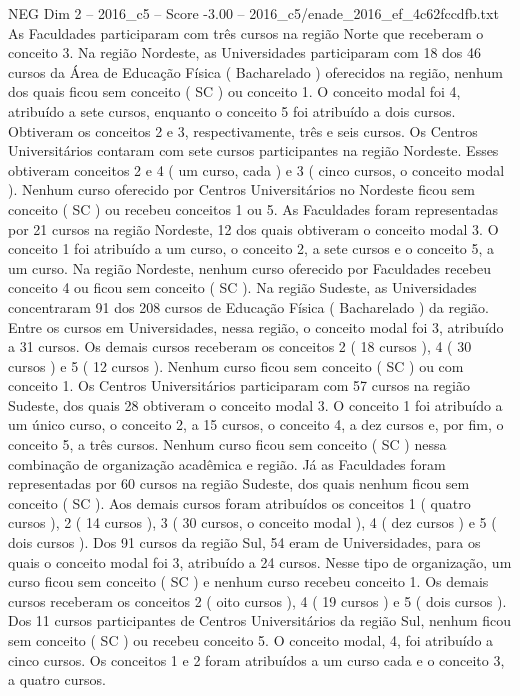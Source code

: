 \begin{textsample}{NEG Dim 2 – 2016\_c5 – Score -3.00 – 2016\_c5/enade\_2016\_ef\_4c62fccdfb.txt}
As Faculdades participaram com três cursos na região Norte que receberam o conceito 3.
Na região Nordeste, as Universidades participaram com 18 dos 46 cursos da Área de Educação Física ( Bacharelado ) oferecidos na região, nenhum dos quais ficou sem conceito ( SC ) ou conceito 1.
O conceito modal foi 4, atribuído a sete cursos, enquanto o conceito 5 foi atribuído a dois cursos.
Obtiveram os conceitos 2 e 3, respectivamente, três e seis cursos.
Os Centros Universitários contaram com sete cursos participantes na região Nordeste.
Esses obtiveram conceitos 2 e 4 ( um curso, cada ) e 3 ( cinco cursos, o conceito modal ).
Nenhum curso oferecido por Centros Universitários no Nordeste ficou sem conceito ( SC ) ou recebeu conceitos 1 ou 5.
As Faculdades foram representadas por 21 cursos na região Nordeste, 12 dos quais obtiveram o conceito modal 3.
O conceito 1 foi atribuído a um curso, o conceito 2, a sete cursos e o conceito 5, a um curso.
Na região Nordeste, nenhum curso oferecido por Faculdades recebeu conceito 4 ou ficou sem conceito ( SC ).
Na região Sudeste, as Universidades concentraram 91 dos 208 cursos de Educação Física ( Bacharelado ) da região.
Entre os cursos em Universidades, nessa região, o conceito modal foi 3, atribuído a 31 cursos.
Os demais cursos receberam os conceitos 2 ( 18 cursos ), 4 ( 30 cursos ) e 5 ( 12 cursos ).
Nenhum curso ficou sem conceito ( SC ) ou com conceito 1.
Os Centros Universitários participaram com 57 cursos na região Sudeste, dos quais 28 obtiveram o conceito modal 3.
O conceito 1 foi atribuído a um único curso, o conceito 2, a 15 cursos, o conceito 4, a dez cursos e, por fim, o conceito 5, a três cursos.
Nenhum curso ficou sem conceito ( SC ) nessa combinação de organização acadêmica e região.
Já as Faculdades foram representadas por 60 cursos na região Sudeste, dos quais nenhum ficou sem conceito ( SC ).
Aos demais cursos foram atribuídos os conceitos 1 ( quatro cursos ), 2 ( 14 cursos ), 3 ( 30 cursos, o conceito modal ), 4 ( dez cursos ) e 5 ( dois cursos ).
Dos 91 cursos da região Sul, 54 eram de Universidades, para os quais o conceito modal foi 3, atribuído a 24 cursos.
Nesse tipo de organização, um curso ficou sem conceito ( SC ) e nenhum curso recebeu conceito 1.
Os demais cursos receberam os conceitos 2 ( oito cursos ), 4 ( 19 cursos ) e 5 ( dois cursos ).
Dos 11 cursos participantes de Centros Universitários da região Sul, nenhum ficou sem conceito ( SC ) ou recebeu conceito 5.
O conceito modal, 4, foi atribuído a cinco cursos.
Os conceitos 1 e 2 foram atribuídos a um curso cada e o conceito 3, a quatro cursos.

\end{textsample}

